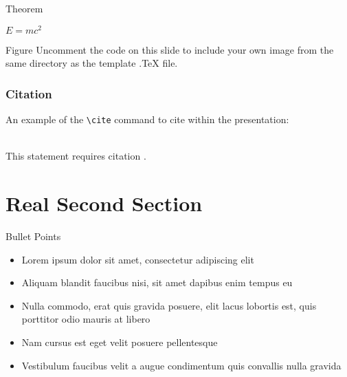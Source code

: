 \documentclass[aspectratio=169,xcolor=dvipsnames]{beamer}
\begin{document}
\begin{frame}{Theorem}
    \begin{theorem}
        $E = mc^2$
    \end{theorem}
\end{frame}


\begin{frame}{Figure}
    Uncomment the code on this slide to include your own image from the same directory as the template .TeX file.
\end{frame}


\begin{frame}[fragile] %
    \frametitle{Citation}
    An example of the \verb|\cite| command to cite within the presentation:\\~

    This statement requires citation \cite{p1}.
\end{frame}



\section{Real Second Section}

\begin{frame}{Bullet Points}
    \begin{itemize}
        \item Lorem ipsum dolor sit amet, consectetur adipiscing elit
        \item Aliquam blandit faucibus nisi, sit amet dapibus enim tempus eu
        \item Nulla commodo, erat quis gravida posuere, elit lacus lobortis est, quis porttitor odio mauris at libero
        \item Nam cursus est eget velit posuere pellentesque
        \item Vestibulum faucibus velit a augue condimentum quis convallis nulla gravida
    \end{itemize}
\end{frame}
\end{document}
